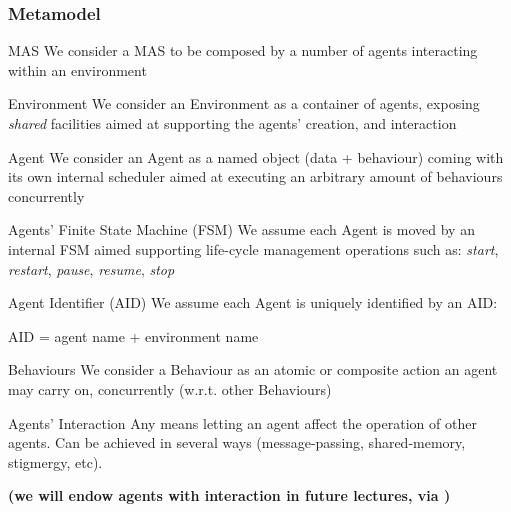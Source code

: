 \documentclass[presentation]{beamer}\mode<presentation>{\usetheme{AMSCesenaPurpleAndGold}}
\begin{document}
\begin{frame}[allowframebreaks]
\frametitle{Metamodel}

	\begin{block}{MAS}
	    We consider a MAS to be composed by a number of agents \alert{interacting} within an environment
	\end{block}

	\bigskip

	\begin{block}{Environment}
		We consider an Environment as a container of agents, exposing \emph{shared} facilities aimed at \alert{supporting} the agents' \alert{creation}, and \alert{interaction}
	\end{block}

	\bigskip

	\begin{block}{Agent}
	    We consider an Agent as a \alert{named} object (data + behaviour) coming with its own \alert{internal scheduler} aimed at executing an arbitrary amount of \alert{behaviours} concurrently
	\end{block}

	\bigskip

	\begin{block}{Agents' Finite State Machine (FSM)}
		We assume each Agent is moved by an internal FSM aimed supporting life-cycle management operations such as: \emph{start}, \emph{restart}, \emph{pause}, \emph{resume}, \emph{stop}
	\end{block}

	\bigskip

	\begin{block}{Agent Identifier (AID)}
		We assume each Agent is uniquely identified by an AID:
		\begin{center}
			AID = agent name + environment name
		\end{center}
	\end{block}

	\bigskip

	\begin{block}{Behaviours}
		We consider a Behaviour as an atomic or composite action an agent may carry on, concurrently (w.r.t. other Behaviours)
	\end{block}

	\bigskip

	\begin{block}{Agents' Interaction}
		Any means letting an agent affect the operation of other agents.
		Can be achieved in several ways (message-passing, shared-memory, stigmergy, etc).
		\begin{center}\bfseries
			(we will endow agents with interaction in future lectures, via \linda{})
		\end{center}
	\end{block}

\end{frame}
\end{document}

